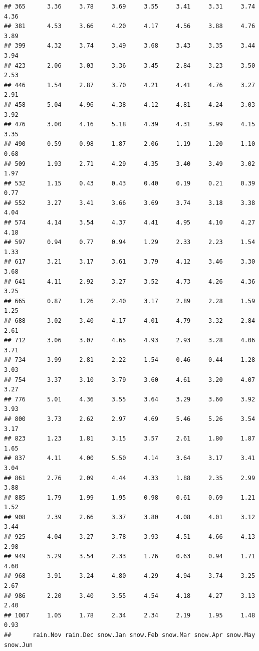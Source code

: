 \documentclass[
]{article}
\begin{document}
\begin{verbatim}
## 365      3.36     3.78     3.69     3.55     3.41     3.31     3.74     4.36
## 381      4.53     3.66     4.20     4.17     4.56     3.88     4.76     3.89
## 399      4.32     3.74     3.49     3.68     3.43     3.35     3.44     3.94
## 423      2.06     3.03     3.36     3.45     2.84     3.23     3.50     2.53
## 446      1.54     2.87     3.70     4.21     4.41     4.76     3.27     2.91
## 458      5.04     4.96     4.38     4.12     4.81     4.24     3.03     3.92
## 476      3.00     4.16     5.18     4.39     4.31     3.99     4.15     3.35
## 490      0.59     0.98     1.87     2.06     1.19     1.20     1.10     0.68
## 509      1.93     2.71     4.29     4.35     3.40     3.49     3.02     1.97
## 532      1.15     0.43     0.43     0.40     0.19     0.21     0.39     0.77
## 552      3.27     3.41     3.66     3.69     3.74     3.18     3.38     4.04
## 574      4.14     3.54     4.37     4.41     4.95     4.10     4.27     4.18
## 597      0.94     0.77     0.94     1.29     2.33     2.23     1.54     1.33
## 617      3.21     3.17     3.61     3.79     4.12     3.46     3.30     3.68
## 641      4.11     2.92     3.27     3.52     4.73     4.26     4.36     3.25
## 665      0.87     1.26     2.40     3.17     2.89     2.28     1.59     1.25
## 688      3.02     3.40     4.17     4.01     4.79     3.32     2.84     2.61
## 712      3.06     3.07     4.65     4.93     2.93     3.28     4.06     3.71
## 734      3.99     2.81     2.22     1.54     0.46     0.44     1.28     3.03
## 754      3.37     3.10     3.79     3.60     4.61     3.20     4.07     3.27
## 776      5.01     4.36     3.55     3.64     3.29     3.60     3.92     3.93
## 800      3.73     2.62     2.97     4.69     5.46     5.26     3.54     3.17
## 823      1.23     1.81     3.15     3.57     2.61     1.80     1.87     1.65
## 837      4.11     4.00     5.50     4.14     3.64     3.17     3.41     3.04
## 861      2.76     2.09     4.44     4.33     1.88     2.35     2.99     3.88
## 885      1.79     1.99     1.95     0.98     0.61     0.69     1.21     1.52
## 908      2.39     2.66     3.37     3.80     4.08     4.01     3.12     3.44
## 925      4.04     3.27     3.78     3.93     4.51     4.66     4.13     2.98
## 949      5.29     3.54     2.33     1.76     0.63     0.94     1.71     4.60
## 968      3.91     3.24     4.80     4.29     4.94     3.74     3.25     2.67
## 986      2.20     3.40     3.55     4.54     4.18     4.27     3.13     2.40
## 1007     1.05     1.78     2.34     2.34     2.19     1.95     1.48     0.93
##      rain.Nov rain.Dec snow.Jan snow.Feb snow.Mar snow.Apr snow.May snow.Jun

\end{verbatim}
\end{document}
